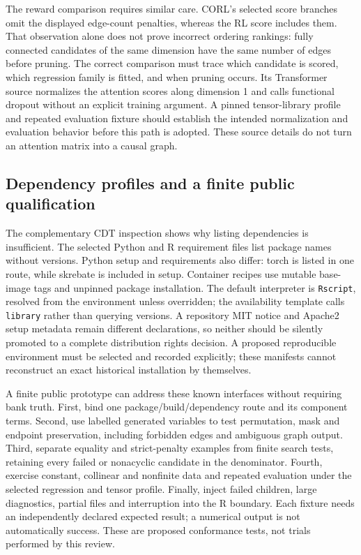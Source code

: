The reward comparison requires similar care. CORL's selected score branches omit the displayed
edge-count penalties, whereas the RL score includes them. That observation alone does not prove
incorrect ordering rankings: fully connected candidates of the same dimension have the same
number of edges before pruning. The correct comparison must trace which candidate is scored,
which regression family is fitted, and when pruning occurs. Its Transformer source normalizes
the attention scores along dimension 1 and calls functional dropout without an explicit training
argument. A pinned tensor-library profile and repeated evaluation fixture should establish the
intended normalization and evaluation behavior before this path is adopted. These source details
do not turn an attention matrix into a causal graph.~\citep{exec28_rl_gcastle}

\subsection{Dependency profiles and a finite public qualification}
The complementary CDT inspection shows why listing dependencies is insufficient. The selected
Python and R requirement files list package names without versions. Python setup and requirements
also differ: torch is listed in one route, while skrebate is included in setup. Container recipes use
mutable base-image tags and unpinned package installation. The default interpreter is
\texttt{Rscript}, resolved from the environment unless overridden; the availability template calls
\texttt{library} rather than querying versions. A repository MIT notice and Apache2 setup metadata
remain different declarations, so neither should be silently promoted to a complete distribution
rights decision. A proposed reproducible environment must be selected and recorded explicitly;
these manifests cannot reconstruct an exact historical installation by themselves.
\citep{exec28_rl_cdt}

A finite public prototype can address these known interfaces without requiring bank truth.
First, bind one package/build/dependency route and its component terms. Second, use labelled
generated variables to test permutation, mask and endpoint preservation, including forbidden edges
and ambiguous graph output. Third, separate equality and strict-penalty examples from finite search
tests, retaining every failed or nonacyclic candidate in the denominator. Fourth, exercise constant,
collinear and nonfinite data and repeated evaluation under the selected regression and tensor
profile. Finally, inject failed children, large diagnostics, partial files and interruption into the
R boundary. Each fixture needs an independently declared expected result; a numerical output is
not automatically success. These are proposed conformance tests, not trials performed by this review.

